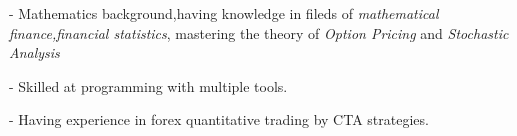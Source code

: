 - Mathematics background,having knowledge in fileds of \textit{mathematical finance,financial statistics},
mastering the theory of \textit{Option Pricing} and \textit{Stochastic Analysis}

- Skilled at programming with multiple tools.

- Having experience in forex quantitative trading by CTA strategies.

\endinput
